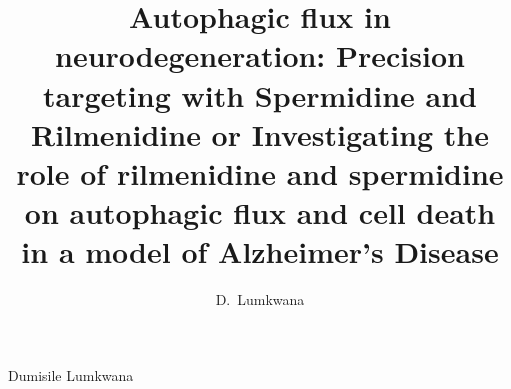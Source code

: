 

\title{Autophagic flux in neurodegeneration: Precision targeting with Spermidine and Rilmenidine or Investigating the role of rilmenidine and spermidine on autophagic flux and cell death in a model of Alzheimer’s Disease} 
\author{D.\ Lumkwana}{Dumisile Lumkwana}


\frontmatter 


\mainmatter









	


